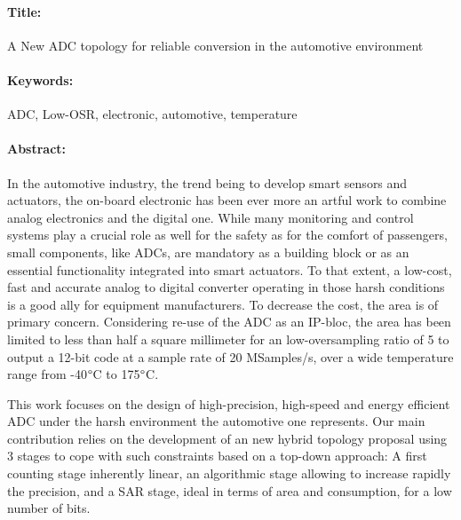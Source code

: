 \vspace*{-5mm}
\begin{mdframed}[linecolor=Prune,linewidth=1]
\fontsize{7}{9}\selectfont
\vspace{-.25cm}
\paragraph*{Title:} A New ADC topology for reliable conversion in the automotive environment

\begin{small}
\vspace{-.5cm}
\paragraph*{Keywords:} 
\fontsize{7}{9}\selectfont
ADC, Low-OSR, electronic, automotive, temperature
\vspace{-.5cm}
\begin{multicols}{2}
\fontsize{7}{9}\selectfont
\paragraph*{Abstract:} 
In the automotive industry, the trend being to develop smart sensors and actuators, the on-board electronic has been ever more an artful work to combine analog electronics and the digital one. While many monitoring and control systems play a crucial role as well for the safety as for the comfort of passengers, small components, like ADCs, are mandatory as a building block or as an essential functionality integrated into smart actuators. To that extent, a low-cost, fast and accurate analog to digital converter operating in those harsh conditions is a good ally for equipment manufacturers. To decrease the cost, the area is of primary concern. Considering re-use of the ADC as an IP-bloc, the area has been limited to less than half a square millimeter for an low-oversampling ratio of 5 to output a 12-bit code at a sample rate of 20 MSamples/s, over a wide temperature range from -40\(\degree \)C to 175\(\degree \)C.

This work focuses on the design of high-precision, high-speed and energy efficient ADC under the harsh environment the automotive one represents. Our main contribution relies on the development of an new hybrid topology proposal using 3 stages to cope with such constraints based on a top-down approach: A first counting stage inherently linear, an algorithmic stage allowing to increase rapidly the precision, and a SAR stage, ideal in terms of area and consumption, for a low number of bits.


\end{multicols}
\end{small}
\end{mdframed}
